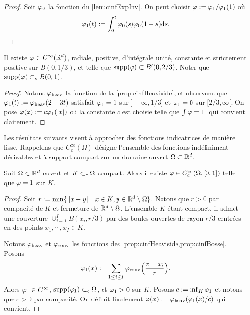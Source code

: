 \begin{proof}
	Soit $\varphi_0$ la fonction du \cref{lem:cinfExpInv}.
	On peut choisir $\varphi := \varphi_1/\varphi_1(1)$ où 
	\begin{equation*}
		\varphi_1(t) := \int_0^t \varphi_0(s) \varphi_0(1-s) \mathrm{d} s.
	\qedhere
	\end{equation*}
\end{proof}


\begin{proposition}	
\label{prop:cinfBosse}
%
	Il existe $\varphi \in C^\infty(\mathbb{R}^d)$, radiale, positive, d'intégrale unité, constante et strictement positive sur $B(0,1/3)$, et telle que $\operatorname{supp}(\varphi) \subset B'(0,2/3)$. 
	Noter que $\operatorname{supp}(\varphi) \subset_c B(0,1)$.
\end{proposition}

\begin{proof}
	Notons $\varphi_\mathrm{heav}$ la fonction de la \cref{prop:cinfHeaviside}, et observons que $\varphi_1(t) := \varphi_\mathrm{heav}(2-3t)$ satisfait $\varphi_1=1$ sur $]-\infty,1/3]$ et $\varphi_1=0$ sur $[2/3,\infty[$. 
	On pose $\varphi(x) := c \varphi_1(|x|)$ où la constante $c$ est choisie telle que $\int \varphi = 1$, qui convient clairement. 
\end{proof}


Les résultats suivants visent à approcher des fonctions indicatrices de manière lisse. Rappelons que $C^\infty_c(\Omega)$ désigne l'ensemble des fonctions indéfiniment dérivables et à support compact sur un domaine ouvert $\Omega \subset \mathbb{R}^d$.


\begin{proposition}	
\label{prop:cinfSupport}
%
	Soit $\Omega\subset \mathbb{R}^d$ ouvert et $K \subset_c \Omega$ compact. 
	Alors il existe $\varphi\in C^\infty_c(\Omega,[0,1])$ telle que $\varphi=1$ sur $K$. 
\end{proposition}

\begin{proof}
Soit $r := \min\{\|x-y\| \mid x \in K, y \in \mathbb{R}^d \setminus \Omega\}$. Notons que $r>0$ par compacité de $K$ et fermeture de $\mathbb{R}^d \setminus \Omega$. 
L'ensemble $K$ étant compact, il admet une couverture $\cup_{i=1}^I B(x_i,r/3)$ par des boules ouvertes de rayon $r/3$ centrées en des points $x_1,\cdots,x_I \in K$. 

Notons $\varphi_\mathrm{heav}$ et $\varphi_\mathrm{conv}$ les fonctions des \cref{prop:cinfHeaviside,prop:cinfBosse}. Posons 
\begin{equation}
	\varphi_1(x) := \sum_{1 \leq i \leq I} \varphi_\mathrm{conv}\Big(\frac{x-x_i} r\Big).
\end{equation}
Alors $\varphi_1\in C^\infty$, $\operatorname{supp}(\varphi_1)\subset_c \Omega$, et $\varphi_1 > 0$ sur $K$.
Posons $c := \inf_K \varphi_1$ et notons que $c>0$ par compacité. 
On définit finalement $\varphi(x) := \varphi_\mathrm{heav}(\varphi_1(x)/c)$ qui convient.
\end{proof}


